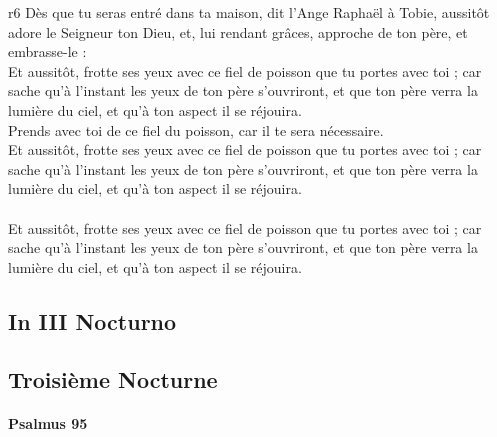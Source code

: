 \documentclass[twoside]{article}
\begin{document}
\begin{paracol}[1]{2}
{	}
	{r6}
	{\rr Dès que tu seras entré dans ta maison, dit l’Ange Raphaël à Tobie, aussitôt adore le Seigneur ton Dieu, et, lui rendant grâces, approche de ton père, et embrasse-le :\\
	\GreSpecial{*} Et aussitôt, frotte ses yeux avec ce fiel de poisson que tu portes avec toi ; car sache qu’à l’instant les yeux de ton père s’ouvriront, et que ton père verra la lumière du ciel, et qu’à ton aspect il se réjouira.\\
	\vv Prends avec toi de ce fiel du poisson, car il te sera nécessaire.\\
	\GreSpecial{*} Et aussitôt, frotte ses yeux avec ce fiel de poisson que tu portes avec toi ; car sache qu’à l’instant les yeux de ton père s’ouvriront, et que ton père verra la lumière du ciel, et qu’à ton aspect il se réjouira.\\
	\versetGloireAuPere{}\\
	\GreSpecial{*} Et aussitôt, frotte ses yeux avec ce fiel de poisson que tu portes avec toi ; car sache qu’à l’instant les yeux de ton père s’ouvriront, et que ton père verra la lumière du ciel, et qu’à ton aspect il se réjouira.}

\subsection{In III Nocturno}

\switchcolumn

\subsection{Troisième Nocturne}

\switchcolumn*

\paragraph{Psalmus 95}



\end{paracol}
\end{document}
